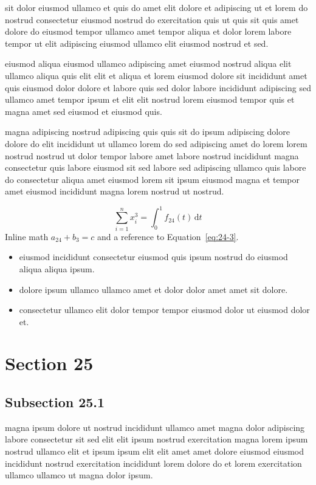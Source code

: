 \documentclass{article}
\begin{document}
sit dolor eiusmod ullamco et quis do amet elit dolore et adipiscing ut et lorem do nostrud consectetur eiusmod nostrud do exercitation quis ut quis sit quis amet dolore do eiusmod tempor ullamco amet tempor aliqua et dolor lorem labore tempor ut elit adipiscing eiusmod ullamco elit eiusmod nostrud et sed.

eiusmod aliqua eiusmod ullamco adipiscing amet eiusmod nostrud aliqua elit ullamco aliqua quis elit elit et aliqua et lorem eiusmod dolore sit incididunt amet quis eiusmod dolor dolore et labore quis sed dolor labore incididunt adipiscing sed ullamco amet tempor ipsum et elit elit nostrud lorem eiusmod tempor quis et magna amet sed eiusmod et eiusmod quis.

magna adipiscing nostrud adipiscing quis quis sit do ipsum adipiscing dolore dolore do elit incididunt ut ullamco lorem do sed adipiscing amet do lorem lorem nostrud nostrud ut dolor tempor labore amet labore nostrud incididunt magna consectetur quis labore eiusmod sit sed labore sed adipiscing ullamco quis labore do consectetur aliqua amet eiusmod lorem sit ipsum eiusmod magna et tempor amet eiusmod incididunt magna lorem nostrud ut nostrud.

\begin{equation}\label{eq:24-3}
  \sum_{i=1}^{n} x_i^{3} = \int_0^1 f_{24}(t)\,\mathrm{d}t
\end{equation}
Inline math $a_{24} + b_{3} = c$ and a reference to Equation~\eqref{eq:24-3}.

\begin{itemize}
  \item eiusmod incididunt consectetur eiusmod quis ipsum nostrud do eiusmod aliqua aliqua ipsum.
  \item dolore ipsum ullamco ullamco amet et dolor dolor amet amet sit dolore.
  \item consectetur ullamco elit dolor tempor tempor eiusmod dolor ut eiusmod dolor et.
\end{itemize}

\section{Section 25}\label{sec:25}
\subsection{Subsection 25.1}\label{sec:25-1}
magna ipsum dolore ut nostrud incididunt ullamco amet magna dolor adipiscing labore consectetur sit sed elit elit ipsum nostrud exercitation magna lorem ipsum nostrud ullamco elit et ipsum ipsum elit elit amet amet dolore eiusmod eiusmod incididunt nostrud exercitation incididunt lorem dolore do et lorem exercitation ullamco ullamco ut magna dolor ipsum.
\end{document}
